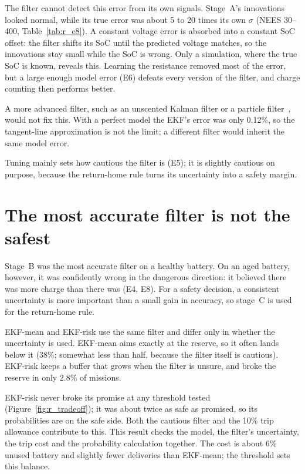 The filter cannot detect this error from its own signals. Stage~A's innovations looked normal, while its true error was about 5 to 20 times its own $\sigma$ (NEES 30--400, Table~\ref{tab:r_e8}). A constant voltage error is absorbed into a constant SoC offset: the filter shifts its SoC until the predicted voltage matches, so the innovations stay small while the SoC is wrong. Only a simulation, where the true SoC is known, reveals this. Learning the resistance removed most of the error, but a large enough model error (E6) defeats every version of the filter, and charge counting then performs better.

A more advanced filter, such as an unscented Kalman filter or a particle filter~\cite{purdue_jate_comparison}, would not fix this. With a perfect model the EKF's error was only 0.12\%, so the tangent-line approximation is not the limit; a different filter would inherit the same model error.

Tuning mainly sets how cautious the filter is (E5); it is slightly cautious on purpose, because the return-home rule turns its uncertainty into a safety margin.

\section{The most accurate filter is not the safest}\label{sec:d_choice}\label{sec:d_value}

Stage~B was the most accurate filter on a healthy battery. On an aged battery, however, it was confidently wrong in the dangerous direction: it believed there was more charge than there was (E4, E8). For a safety decision, a consistent uncertainty is more important than a small gain in accuracy, so stage~C is used for the return-home rule.

EKF-mean and EKF-risk use the same filter and differ only in whether the uncertainty is used. EKF-mean aims exactly at the reserve, so it often lands below it (38\%; somewhat less than half, because the filter itself is cautious). EKF-risk keeps a buffer that grows when the filter is unsure, and broke the reserve in only 2.8\% of missions.

EKF-risk never broke its promise at any threshold tested (Figure~\ref{fig:r_tradeoff}); it was about twice as safe as promised, so its probabilities are on the safe side. Both the cautious filter and the 10\% trip allowance contribute to this. This result checks the model, the filter's uncertainty, the trip cost and the probability calculation together. The cost is about 6\% unused battery and slightly fewer deliveries than EKF-mean; the threshold sets this balance.

